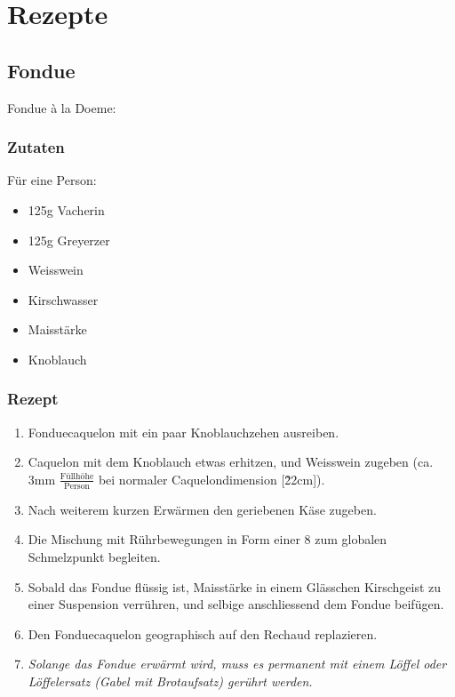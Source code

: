 \documentclass[oneside,12pt,a4paper]{scrartcl}
\begin{document}
\section{Rezepte}
\subsection{Fondue}
Fondue à la Doeme:

\subsubsection{Zutaten}
Für eine Person:
\begin{itemize}
\item 125g Vacherin
\item 125g Greyerzer
\item Weisswein
\item Kirschwasser
\item Maisstärke
\item Knoblauch
\end{itemize}
\subsubsection{Rezept}

\begin{enumerate}
\item Fonduecaquelon mit ein paar Knoblauchzehen ausreiben.
\item Caquelon mit dem Knoblauch etwas erhitzen, und Weisswein zugeben (ca. 3mm $\frac {\mbox{Füllhöhe}} {\mbox{Person}}$ bei normaler Caquelondimension [\~22cm]).
\item Nach weiterem kurzen Erwärmen den geriebenen Käse zugeben.
\item Die Mischung mit Rührbewegungen in Form einer 8 zum globalen Schmelzpunkt begleiten.
\item Sobald das Fondue flüssig ist, Maisstärke in einem Glässchen Kirschgeist zu einer Suspension verrühren, und selbige anschliessend dem Fondue beifügen.
\item Den Fonduecaquelon geographisch auf den Rechaud replazieren.
\item \emph{Solange das Fondue erwärmt wird, muss es permanent mit einem Löffel oder Löffelersatz (Gabel mit Brotaufsatz) gerührt werden.} 
\end{enumerate}
\end{document}
